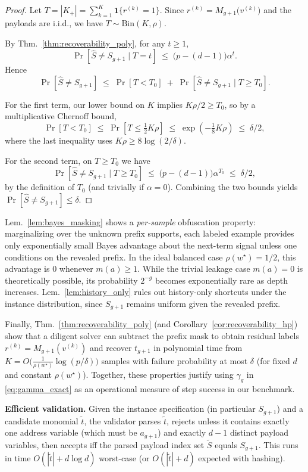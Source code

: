 \documentclass{article}
\begin{document}
\begin{proof}
Let $T=|K_+|=\sum_{k=1}^K \mathbf{1}\{r^{(k)}=1\}$. Since $r^{(k)}=M_{g+1}\!\big(v^{(k)}\big)$ and the payloads are i.i.d.,
we have $T\sim \mathrm{Bin}(K,\rho)$.

By Thm.~\ref{thm:recoverability_poly}, for any $t\ge 1$,
\[
\Pr[\widehat S\neq S_{g+1}\mid T=t] \;\le\; \big(p-(d-1)\big)\alpha^{t}.
\]
Hence
\[
\Pr[\widehat S\neq S_{g+1}]
\;\le\;
\Pr[T<T_0] \;+\; \Pr[\widehat S\neq S_{g+1}\mid T\ge T_0].
\]

For the first term, our lower bound on $K$ implies $K\rho/2 \ge T_0$, so by a multiplicative Chernoff bound,
\[
\Pr[T<T_0]
\;\le\;
\Pr\!\left[T \le \tfrac12 K\rho\right]
\;\le\;
\exp\!\left(-\tfrac18 K\rho\right)
\;\le\;
\delta/2,
\]
where the last inequality uses $K\rho \ge 8\log(2/\delta)$.

For the second term, on $T\ge T_0$ we have
\[
\Pr[\widehat S\neq S_{g+1}\mid T\ge T_0]
\;\le\;
\big(p-(d-1)\big)\alpha^{T_0}
\;\le\;
\delta/2,
\]
by the definition of $T_0$ (and trivially if $\alpha=0$). Combining the two bounds yields
$\Pr[\widehat S\neq S_{g+1}] \le \delta$.
\end{proof}

Lem.~\ref{lem:bayes_masking} shows a \emph{per-sample} obfuscation property: marginalizing over the unknown prefix supports,
each labeled example provides only exponentially small Bayes advantage about the next-term signal unless one conditions on the revealed
prefix. In the ideal balanced case $\rho(w^\star)=1/2$, this advantage is $0$ whenever $m(a)\ge 1$.
While the trivial leakage case $m(a)=0$ is theoretically possible, its probability $2^{-g}$ becomes exponentially rare as depth increases.
Lem.~\ref{lem:history_only} rules out history-only shortcuts under the instance distribution, since $S_{g+1}$ remains uniform given the
revealed prefix.

Finally, Thm.~\ref{thm:recoverability_poly} (and Corollary~\ref{cor:recoverability_hp}) show that a diligent solver can subtract the prefix mask to obtain residual labels $r^{(k)}=M_{g+1}(v^{(k)})$ and recover $t_{g+1}$ in polynomial time from
$K=O\!\big(\tfrac{1}{\rho(w^\star)}\log(p/\delta)\big)$ samples with failure probability at most $\delta$ (for fixed $d$ and constant $\rho(w^\star)$). Together, these properties justify using $\gamma_g$ in \eqref{eq:gamma_exact} as an operational measure of step success in our benchmark.

{\bf Efficient validation.\enspace} Given the instance specification (in particular $S_{g+1}$) and a candidate monomial $\tilde t$,
the validator parses $\tilde t$, rejects unless it contains exactly one address variable (which must be $a_{g+1}$) and exactly $d-1$ distinct payload variables, then accepts iff the parsed payload index set $\widetilde S$ equals $S_{g+1}$. This runs in time $O(|\tilde t| + d\log d)$ worst-case (or $O(|\tilde t| + d)$ expected with hashing).

\newpage

\end{document}
